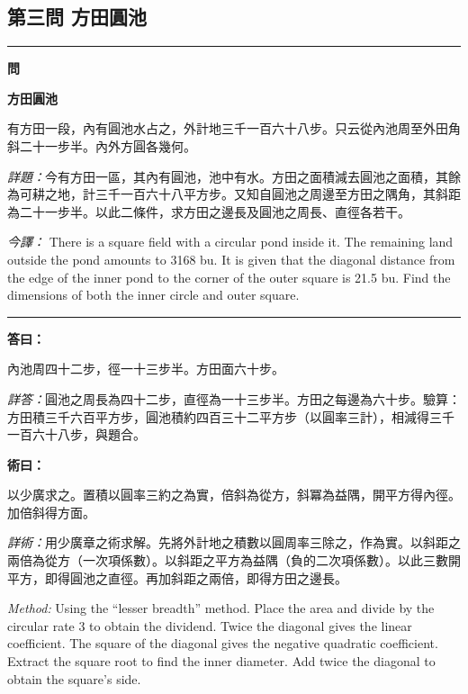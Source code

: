 \documentclass[11pt,a4paper]{article}
\newenvironment{problem}[1][]{%
  \medskip\noindent\rule{\textwidth}{0.4pt}%
  \par\noindent\textbf{\color{sectioncolor}#1}\par\nopagebreak%
  \smallskip%
}{%
  \par\noindent\rule{\textwidth}{0.4pt}\medskip%
}
\newenvironment{answer}{%
  \medskip\noindent{\color{answercolor}\rule{0.5\textwidth}{0.5pt}}%
  \par\color{answercolor}%
}{%
  \par\medskip%
}
\newenvironment{method}{%
  \medskip\noindent{\color{methodcolor}\rule{0.5\textwidth}{0.5pt}}%
  \par\color{methodcolor}%
}{%
  \par\medskip%
}
\begin{document}
\subsection*{第三問 方田圓池}

\begin{problem}[\textbf{問}]
\textbf{\color{sectioncolor}方田圓池}

有方田一段，內有圓池水占之，外計地三千一百六十八步。只云從內池周至外田角斜二十一步半。內外方圓各幾何。

\medskip
\textit{詳題：}今有方田一區，其內有圓池，池中有水。方田之面積減去圓池之面積，其餘為可耕之地，計三千一百六十八平方步。又知自圓池之周邊至方田之隅角，其斜距為二十一步半。以此二條件，求方田之邊長及圓池之周長、直徑各若干。

\medskip
\textit{今譯：} There is a square field with a circular pond inside it. The remaining land outside the pond amounts to 3168 bu. It is given that the diagonal distance from the edge of the inner pond to the corner of the outer square is 21.5 bu. Find the dimensions of both the inner circle and outer square.
\end{problem}

\begin{answer}
\textbf{答曰：}

內池周四十二步，徑一十三步半。方田面六十步。

\medskip
\textit{詳答：}圓池之周長為四十二步，直徑為一十三步半。方田之每邊為六十步。驗算：方田積三千六百平方步，圓池積約四百三十二平方步（以圓率三計），相減得三千一百六十八步，與題合。
\end{answer}

\begin{method}
\textbf{術曰：}

以少廣求之。置積以圓率三約之為實，倍斜為從方，斜冪為益隅，開平方得內徑。加倍斜得方面。

\medskip
\textit{詳術：}用少廣章之術求解。先將外計地之積數以圓周率三除之，作為實。以斜距之兩倍為從方（一次項係數）。以斜距之平方為益隅（負的二次項係數）。以此三數開平方，即得圓池之直徑。再加斜距之兩倍，即得方田之邊長。

\medskip
\textit{Method:} Using the ``lesser breadth'' method. Place the area and divide by the circular rate 3 to obtain the dividend. Twice the diagonal gives the linear coefficient. The square of the diagonal gives the negative quadratic coefficient. Extract the square root to find the inner diameter. Add twice the diagonal to obtain the square's side.
\end{method}
\end{document}
